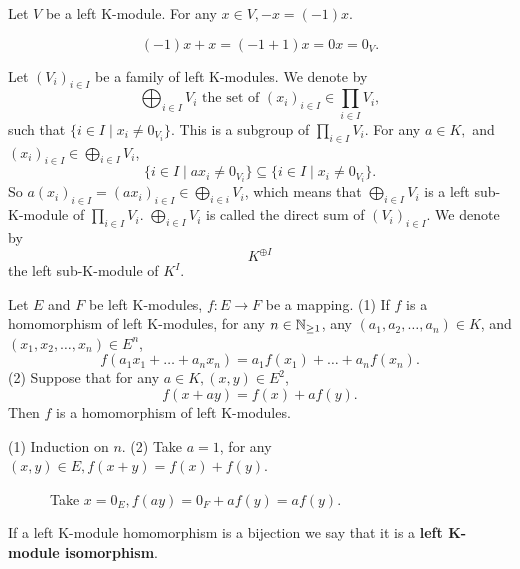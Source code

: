 \begin{propositionenv}
    Let $V$ be a left K-module. For any $x\in V,  -x=(-1)x$.
\end{propositionenv}
\begin{proofenv}
    $$(-1)x+x=(-1+1)x=0x=0_V.$$
\end{proofenv}
\begin{exampleenv}
    Let $(V_i)_{i\in I}$ be a family of left K-modules. We denote by 
    $$\bigoplus_{i\in I}V_i\text{ the set of }(x_i)_{i\in I}\in \prod_{i\in I}V_i, $$
    such that $\{i\in I\mid x_i\not=0_{V_i}\}$. This is a subgroup of $\prod_{i\in I}V_i$. For any $a\in K, $ and $(x_i)_{i\in I}\in \bigoplus_{i\in I}V_i$, 
    $$\{i\in I\mid ax_i\not=0_{V_i}\}\subseteq\{i\in I\mid x_i\not=0_{V_i}\}.$$
    So $\displaystyle a(x_i)_{i\in I}=(ax_i)_{i\in I}\in \bigoplus_{i\in i}V_i$,  which means that $\displaystyle\bigoplus_{i\in I}V_i$ is a left sub-K-module of $\displaystyle\prod_{i\in I}V_i$. $\displaystyle\bigoplus_{i\in I}V_i$ is called the direct sum of $(V_i)_{i\in I}$. We denote by 
    $$K^{\oplus I}$$
    the left sub-K-module of $K^I$.
\end{exampleenv}
\begin{propositionenv}
    Let $E$ and $F$ be left K-modules, $f:E\rightarrow F$ be a mapping.
    \newline
    (1) If $f$ is a homomorphism of left K-modules,  for any $n\in \mathbb{N}_{\ge1}$,  any $(a_1, a_2, \dots, a_n)\in K$,  and $(x_1, x_2, \dots, x_n)\in E^n$, 
    $$f(a_1x_1+\dots+a_nx_n)=a_1f(x_1)+\dots+a_nf(x_n).$$
    (2) Suppose that for any $a\in K, (x, y)\in E^2$, 
    $$f(x+ay)=f(x)+af(y).$$
    Then $f$ is a homomorphism of left K-modules.
\end{propositionenv}
\begin{proofenv}
    (1) Induction on $n$.
    \newline
    (2) Take $a=1$,  for any $(x, y)\in E, f(x+y)=f(x)+f(y)$. 
    
    \ \ \ \ \ \ Take $x=0_E, f(ay)=0_F+af(y)=af(y)$.
\end{proofenv}
\begin{definitionenv}
    If a left K-module homomorphism is a bijection we say that it is a \textbf{left K-module isomorphism}.
\end{definitionenv}

